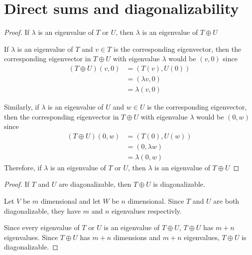 \section{Direct sums and diagonalizability}
\begin{proof} 
    If $\lambda$ is an eigenvalue of $T$ or $U$,
    then $\lambda$ is an eigenvalue of $T \oplus U$\gap
    
    If $\lambda$ is an eigenvalue of $T$ and
    $v \in T$ is the corresponding eigenvector,
    then the corresponding eigenvector in $T \oplus U$
    with eigenvalue $\lambda$
    would be $(v, 0)$ since
    \begin{align}
        (T \oplus U)(v, 0)
        &= (T(v), U(0)) \\
        &= (\lambda v, 0)\\
        &= \lambda(v, 0)
    \end{align}
    
    Similarly, if $\lambda$ is an eigenvalue of $U$ and
    $w \in U$ is the corresponding eigenvector,
    then the corresponding eigenvector in $T \oplus U$
    with eigenvalue $\lambda$
    would be $(0, w)$ since
    \begin{align}
        (T \oplus U)(0, w)
        &= (T(0), U(w)) \\
        &= (0, \lambda w)\\
        &= \lambda(0, w)
    \end{align}
    Therefore, if $\lambda$ is an eigenvalue of $T$ or $U$,
    then $\lambda$ is an eigenvalue of $T \oplus U$
\end{proof}

\begin{proof} If $T$ and $U$ are diagonalizable, then $T \oplus U$ is diagonalizable. \gap
    
    Let $V$ be $m$ dimensional and let $W$ be $n$ dimensional.
    Since $T$ and $U$ are both diagonalizable, 
    they have $m$ and $n$ eigenvalues respectivly. \gap

    Since every eigenvalue of $T$ or $U$ is an eigenvalue of $T \oplus U$,
    $T \oplus U$ has $m+n$ eigenvalues.
    Since $T \oplus U$ has $m+n$ dimensions and $m+n$ eigenvalues,
    $T \oplus U$ is diagonalizable.
\end{proof}
